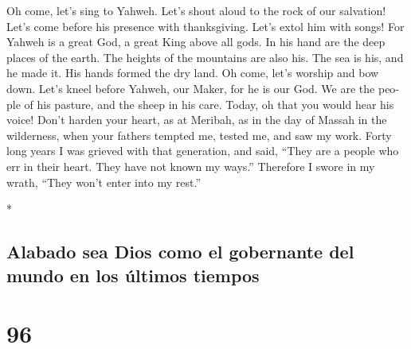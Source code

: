 \begin{paracol}{2}
\begin{otherlanguage}{english}
 Oh come, let's sing to Yahweh. Let's shout aloud to the
rock of our salvation!  Let's come before his presence
with thanksgiving. Let's extol him with songs!  For Yahweh
is a great God, a great King above all gods.  In his hand
are the deep places of the earth. The heights of the mountains are also
his.  The sea is his, and he made it. His hands formed the
dry land.  Oh come, let's worship and bow down. Let's
kneel before Yahweh, our Maker,  for he is our God. We are
the people of his pasture, and the sheep in his care. Today, oh that you
would hear his voice!  Don't harden your heart, as at
Meribah, as in the day of Massah in the wilderness,  when
your fathers tempted me, tested me, and saw my work. 
Forty long years I was grieved with that generation, and said, ``They
are a people who err in their heart. They have not known my ways.''
 Therefore I swore in my wrath, ``They won't enter into
my rest.''

\end{otherlanguage}

\switchcolumn[0]*

\hypertarget{alabado-sea-dios-como-el-gobernante-del-mundo-en-los-uxfaltimos-tiempos}{%
\subsection{Alabado sea Dios como el gobernante del mundo en los últimos
tiempos}\label{alabado-sea-dios-como-el-gobernante-del-mundo-en-los-uxfaltimos-tiempos}}

\hypertarget{section-190}{%
\section{96}\label{section-190}}


\end{paracol}
